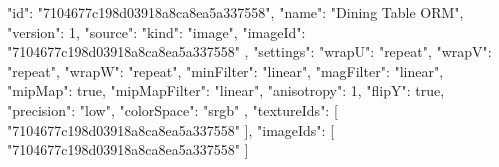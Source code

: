 {
  "id": "7104677c198d03918a8ca8ea5a337558",
  "name": "Dining Table ORM",
  "version": 1,
  "source": {
    "kind": "image",
    "imageId": "7104677c198d03918a8ca8ea5a337558"
  },
  "settings": {
    "wrapU": "repeat",
    "wrapV": "repeat",
    "wrapW": "repeat",
    "minFilter": "linear",
    "magFilter": "linear",
    "mipMap": true,
    "mipMapFilter": "linear",
    "anisotropy": 1,
    "flipY": true,
    "precision": "low",
    "colorSpace": "srgb"
  },
  "textureIds": [
    "7104677c198d03918a8ca8ea5a337558"
  ],
  "imageIds": [
    "7104677c198d03918a8ca8ea5a337558"
  ]
}
